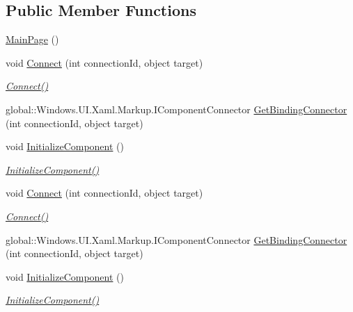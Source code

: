 \subsection*{Public Member Functions}
\begin{DoxyCompactItemize}
\item 
\hyperlink{class_e_l_i_client_1_1_main_page_ae4c43f0abef6a296bfb0896e2b0dce55}{Main\+Page} ()
\item 
void \hyperlink{class_e_l_i_client_1_1_main_page_a0c1c77db7411dc2fda3c8ca08933b0e4}{Connect} (int connection\+Id, object target)
\begin{DoxyCompactList}\small\item\em \hyperlink{class_e_l_i_client_1_1_main_page_a0c1c77db7411dc2fda3c8ca08933b0e4}{Connect()} \end{DoxyCompactList}\item 
global\+::\+Windows.\+U\+I.\+Xaml.\+Markup.\+I\+Component\+Connector \hyperlink{class_e_l_i_client_1_1_main_page_a9d43e9315d46dfb8b65575540e3d939b}{Get\+Binding\+Connector} (int connection\+Id, object target)
\item 
void \hyperlink{class_e_l_i_client_1_1_main_page_a337e38b87a30d8d30bcc2a9164f0ac41}{Initialize\+Component} ()
\begin{DoxyCompactList}\small\item\em \hyperlink{class_e_l_i_client_1_1_main_page_a337e38b87a30d8d30bcc2a9164f0ac41}{Initialize\+Component()} \end{DoxyCompactList}\item 
void \hyperlink{class_e_l_i_client_1_1_main_page_a0c1c77db7411dc2fda3c8ca08933b0e4}{Connect} (int connection\+Id, object target)
\begin{DoxyCompactList}\small\item\em \hyperlink{class_e_l_i_client_1_1_main_page_a0c1c77db7411dc2fda3c8ca08933b0e4}{Connect()} \end{DoxyCompactList}\item 
global\+::\+Windows.\+U\+I.\+Xaml.\+Markup.\+I\+Component\+Connector \hyperlink{class_e_l_i_client_1_1_main_page_a9d43e9315d46dfb8b65575540e3d939b}{Get\+Binding\+Connector} (int connection\+Id, object target)
\item 
void \hyperlink{class_e_l_i_client_1_1_main_page_a337e38b87a30d8d30bcc2a9164f0ac41}{Initialize\+Component} ()
\begin{DoxyCompactList}\small\item\em \hyperlink{class_e_l_i_client_1_1_main_page_a337e38b87a30d8d30bcc2a9164f0ac41}{Initialize\+Component()} \end{DoxyCompactList}\item 

\end{DoxyCompactItemize}
